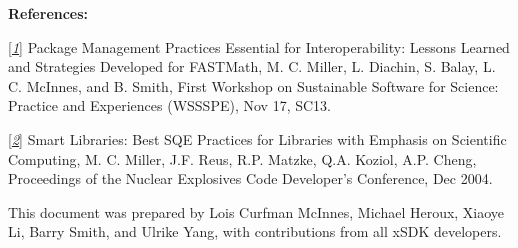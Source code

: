 \documentclass[]{article}
\begin{document}
\textbf{References:}

{[}\href{https://figshare.com/articles/Package_Management_Practices_Essential_for_Interoperability_Lessons_Learned_and_Strategies_Developed_for_FASTMath/789055}{\emph{1}}{]}
Package Management Practices Essential for Interoperability: Lessons
Learned and Strategies Developed for FASTMath, M. C. Miller, L. Diachin,
S. Balay, L. C. McInnes, and B. Smith, First Workshop on Sustainable
Software for Science: Practice and Experiences (WSSSPE), Nov 17,
SC13.

{[}\href{https://wci.llnl.gov/codes/smartlibs/UCRL-JRNL-208636.pdf}{\emph{2}}{]}
Smart Libraries: Best SQE Practices for Libraries with Emphasis on
Scientific Computing, M. C. Miller, J.F. Reus, R.P. Matzke, Q.A. Koziol,
A.P. Cheng, Proceedings of the Nuclear Explosives Code Developer's
Conference, Dec 2004.

This document was prepared by Lois Curfman McInnes, Michael Heroux,
Xiaoye Li, Barry Smith, and Ulrike Yang, with contributions from all
xSDK developers.
\end{document}
